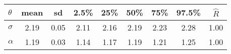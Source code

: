 \begin{table}[ht]
  \centering
  \begin{tabular}{ l c c c c c c c c }
    \hline
    $\theta$ & mean & sd & 2.5\% & 25\% & 50\% & 75\% & 97.5\% & $\hat{R}$ \\ 
    \hline
    $\sigma$ & 2.19 & 0.05 & 2.11 & 2.16 & 2.19 & 2.23 & 2.28 & 1.00 \\ 
    $\alpha$ & 1.19 & 0.03 & 1.14 & 1.17 & 1.19 & 1.21 & 1.25 & 1.00 \\ 
    \hline
  \end{tabular}
  \label{zfit_tab}
\end{table}

